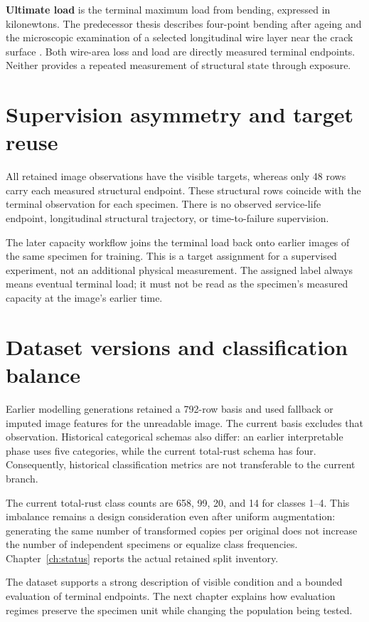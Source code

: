 \textbf{Ultimate load} is the terminal maximum load from bending, expressed in kilonewtons. The predecessor thesis describes four-point bending after ageing and the microscopic examination of a selected longitudinal wire layer near the crack surface \citep[secs.~4.2.2.3, 4.2.3, and 5.2.1]{hossain_thesis}. Both wire-area loss and load are directly measured terminal endpoints. Neither provides a repeated measurement of structural state through exposure.

\section{Supervision asymmetry and target reuse}
All retained image observations have the visible targets, whereas only 48 rows carry each measured structural endpoint. These structural rows coincide with the terminal observation for each specimen. There is no observed service-life endpoint, longitudinal structural trajectory, or time-to-failure supervision.

The later capacity workflow joins the terminal load back onto earlier images of the same specimen for training. This is a target assignment for a supervised experiment, not an additional physical measurement. The assigned label always means eventual terminal load; it must not be read as the specimen's measured capacity at the image's earlier time.

\section{Dataset versions and classification balance}
Earlier modelling generations retained a 792-row basis and used fallback or imputed image features for the unreadable image. The current basis excludes that observation. Historical categorical schemas also differ: an earlier interpretable phase uses five categories, while the current total-rust schema has four. Consequently, historical classification metrics are not transferable to the current branch.

The current total-rust class counts are 658, 99, 20, and 14 for classes 1--4. This imbalance remains a design consideration even after uniform augmentation: generating the same number of transformed copies per original does not increase the number of independent specimens or equalize class frequencies. Chapter~\ref{ch:status} reports the actual retained split inventory.

The dataset supports a strong description of visible condition and a bounded evaluation of terminal endpoints. The next chapter explains how evaluation regimes preserve the specimen unit while changing the population being tested.
